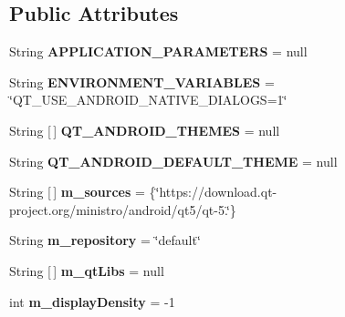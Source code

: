 \subsection*{Public Attributes}
\begin{DoxyCompactItemize}
\item 
\mbox{\label{classorg_1_1qtproject_1_1qt5_1_1android_1_1bindings_1_1_qt_loader_ad3eb0a52beae1b5d4aaa6d507a0b94c0}} 
String {\bfseries A\+P\+P\+L\+I\+C\+A\+T\+I\+O\+N\+\_\+\+P\+A\+R\+A\+M\+E\+T\+E\+RS} = null
\item 
\mbox{\label{classorg_1_1qtproject_1_1qt5_1_1android_1_1bindings_1_1_qt_loader_ab4e249729b61727efd65b82f64759ce4}} 
String {\bfseries E\+N\+V\+I\+R\+O\+N\+M\+E\+N\+T\+\_\+\+V\+A\+R\+I\+A\+B\+L\+ES} = \char`\"{}Q\+T\+\_\+\+U\+S\+E\+\_\+\+A\+N\+D\+R\+O\+I\+D\+\_\+\+N\+A\+T\+I\+V\+E\+\_\+\+D\+I\+A\+L\+O\+GS=1\char`\"{}
\item 
\mbox{\label{classorg_1_1qtproject_1_1qt5_1_1android_1_1bindings_1_1_qt_loader_a7bfa5dec5577a0e854aa8925927fdff2}} 
String \mbox{[}$\,$\mbox{]} {\bfseries Q\+T\+\_\+\+A\+N\+D\+R\+O\+I\+D\+\_\+\+T\+H\+E\+M\+ES} = null
\item 
\mbox{\label{classorg_1_1qtproject_1_1qt5_1_1android_1_1bindings_1_1_qt_loader_a6e8031d38699c0c64f2858e5d4b8cada}} 
String {\bfseries Q\+T\+\_\+\+A\+N\+D\+R\+O\+I\+D\+\_\+\+D\+E\+F\+A\+U\+L\+T\+\_\+\+T\+H\+E\+ME} = null
\item 
\mbox{\label{classorg_1_1qtproject_1_1qt5_1_1android_1_1bindings_1_1_qt_loader_ac812615e11f80cb954a0bee944c714b6}} 
String \mbox{[}$\,$\mbox{]} {\bfseries m\+\_\+sources} = \{\char`\"{}https\+://download.\+qt-\/project.\+org/ministro/android/qt5/qt-\/5.\char`\"{}\}
\item 
\mbox{\label{classorg_1_1qtproject_1_1qt5_1_1android_1_1bindings_1_1_qt_loader_ad64e6977c4c943495c1131b7560603cd}} 
String {\bfseries m\+\_\+repository} = \char`\"{}default\char`\"{}
\item 
\mbox{\label{classorg_1_1qtproject_1_1qt5_1_1android_1_1bindings_1_1_qt_loader_a49c408d5faab2afa5894bb8cb2dcd6ef}} 
String \mbox{[}$\,$\mbox{]} {\bfseries m\+\_\+qt\+Libs} = null
\item 
\mbox{\label{classorg_1_1qtproject_1_1qt5_1_1android_1_1bindings_1_1_qt_loader_a1645236780ca01582a46061dcadb1bbd}} 
int {\bfseries m\+\_\+display\+Density} = -\/1
\end{DoxyCompactItemize}
